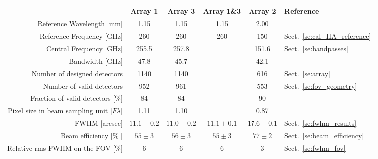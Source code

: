 \begin{table}[h]
\begin{center}    
  \begin{threeparttable}
    \begin{tabular}{|r|c|c|c|c|l|}
      \hline
      & Array 1 & Array 3  & Array 1\&3 & Array 2 & Reference \\
      \hline
      \hline
      Reference Wavelength  [mm]  &  1.15    &  1.15   & 1.15  & 2.00   &   \\
      Reference Frequency  [GHz]  &  260    &  260   & 260  & 150   &  Sect.~\ref{se:cal_HA_reference}  \\
      Central Frequency [GHz]     &  255.5  &  257.8 &      & 151.6 &  Sect.~\ref{se:bandpasses}  \\
      Bandwidth         [GHz]     &  47.8   &  45.7  &      & 42.1  &   \\
      \hline
      Number of designed detectors                   & 1140      &  1140    &    &    616  & Sect.~\ref{se:array}\\
      Number of valid detectors                      &  952      &   961    &    &    553  & Sect.~\ref{se:fov_geometry}\\
      Fraction of valid detectors [$\%$]             &  84       &   84     &    &     90  & \\
      Pixel size in beam sampling unit\tnote{(a)}\hspace{3mm} [$F\lambda$] & 1.11 & 1.10  &  &  0.87 & \\
      \hline
      FWHM\tnote{(b)}\hspace{3mm} [arcsec]    &  $11.1 \pm 0.2$   &  $11.0 \pm 0.2$  &   $11.1 \pm 0.1$  &  $17.6 \pm 0.1$  &  Sect.~\ref{se:fwhm_results}\\
      Beam efficiency\tnote{(c)}\hspace{3mm} [\% ] &  $55 \pm 3$  &  $56 \pm 3$   &  $55 \pm 3$   &  $77 \pm 2$  &  Sect.~\ref{se:beam_efficiency}\\
      Relative rms FWHM on the FOV [$\%$]          &    6         &      6        &       6        &      3        & Sect.~\ref{se:fwhm_fov}\\

\end{tabular}
\end{threeparttable}
\end{center}
\end{table}
